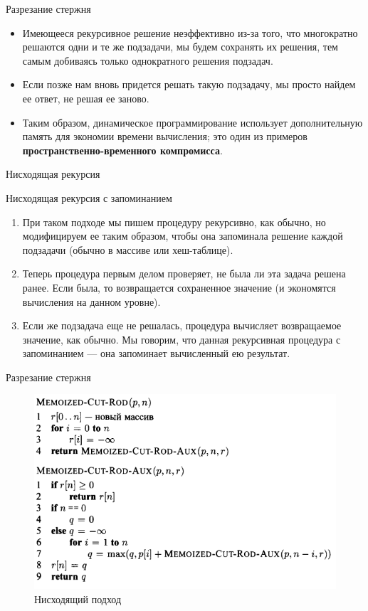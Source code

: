 \documentclass{beamer}
\begin{document}
\begin{frame}[t]{Разрезание стержня}
    \begin{itemize}
        \item Имеющееся рекурсивное решение неэффективно из-за того, что многократно решаются одни и те же подзадачи, мы будем сохранять их решения, тем самым добиваясь только однократного решения подзадач.
    
        \item Если позже нам вновь придется решать такую подзадачу, мы просто найдем ее ответ, не решая ее заново. 
    
        \item Таким образом, динамическое программирование использует дополнительную память для экономии времени вычисления; это один из примеров \textbf{пространственно-временного компромисса}.
    \end{itemize}
\end{frame}

\begin{frame}[t]{Нисходящая рекурсия}
    \begin{block}{Нисходящая рекурсия с запоминанием}
        \begin{enumerate}
            \item При таком подходе мы пишем процедуру рекурсивно, как обычно, но модифицируем ее таким образом, чтобы она запоминала решение каждой подзадачи (обычно в массиве или хеш-таблице). 
            \item Теперь процедура первым делом проверяет, не была ли эта задача решена ранее. Если была, то возвращается сохраненное значение (и экономятся вычисления на данном уровне). 
            \item Если же подзадача еще не решалась, процедура вычисляет возвращаемое значение, как обычно. Мы говорим, что данная рекурсивная процедура с запоминанием — она запоминает вычисленный ею результат.
        \end{enumerate}
    \end{block}
\end{frame}

\begin{frame}[t]{Разрезание стержня}
    \begin{figure}[h]
		\centering
		\includegraphics[scale=0.6]{images/lec09-pic06.png}
		\caption{Нисходящий подход}
	\end{figure}
\end{frame}
\end{document}
